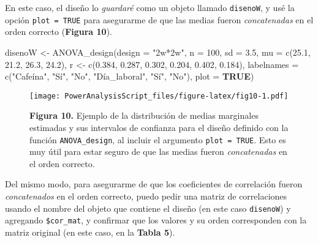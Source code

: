 \documentclass[
]{article}
\newenvironment{Shaded}{\begin{snugshade}}{\end{snugshade}}
\newcommand{\AttributeTok}[1]{\textcolor[rgb]{0.16,0.50,0.73}{#1}}
\newcommand{\ConstantTok}[1]{\textcolor[rgb]{0.15,0.68,0.68}{\textbf{#1}}}
\newcommand{\DecValTok}[1]{\textcolor[rgb]{0.96,0.45,0.00}{#1}}
\newcommand{\FloatTok}[1]{\textcolor[rgb]{0.96,0.45,0.00}{#1}}
\newcommand{\FunctionTok}[1]{\textcolor[rgb]{0.56,0.27,0.68}{#1}}
\newcommand{\NormalTok}[1]{\textcolor[rgb]{0.81,0.81,0.76}{#1}}
\newcommand{\OtherTok}[1]{\textcolor[rgb]{0.15,0.68,0.38}{#1}}
\newcommand{\StringTok}[1]{\textcolor[rgb]{0.96,0.31,0.31}{#1}}
\begin{document}
En este caso, el diseño lo \emph{guardaré} como un objeto llamado
\texttt{disenoW}, y usé la opción \texttt{plot\ =\ TRUE} para asegurarme
de que las medias fueron \emph{concatenadas} en el orden correcto
(\textbf{Figura 10}).

\begin{Shaded}
\begin{Highlighting}[]
\NormalTok{disenoW }\OtherTok{\textless{}{-}} \FunctionTok{ANOVA\_design}\NormalTok{(}\AttributeTok{design =} \StringTok{"2w*2w"}\NormalTok{,}
                        \AttributeTok{n =} \DecValTok{100}\NormalTok{, }\AttributeTok{sd =} \FloatTok{3.5}\NormalTok{, }
                        \AttributeTok{mu =} \FunctionTok{c}\NormalTok{(}\FloatTok{25.1}\NormalTok{, }\FloatTok{21.2}\NormalTok{, }\FloatTok{26.3}\NormalTok{, }\FloatTok{24.2}\NormalTok{), }
\NormalTok{                        r }\OtherTok{\textless{}{-}} \FunctionTok{c}\NormalTok{(}\FloatTok{0.384}\NormalTok{, }\FloatTok{0.287}\NormalTok{, }\FloatTok{0.302}\NormalTok{, }\FloatTok{0.204}\NormalTok{, }\FloatTok{0.402}\NormalTok{, }\FloatTok{0.184}\NormalTok{),}
                        \AttributeTok{labelnames =} \FunctionTok{c}\NormalTok{(}\StringTok{"Cafeína"}\NormalTok{, }\StringTok{"Sí"}\NormalTok{, }\StringTok{"No"}\NormalTok{, }\StringTok{"Día\_laboral"}\NormalTok{, }\StringTok{"Sí"}\NormalTok{, }\StringTok{"No"}\NormalTok{),}
                        \AttributeTok{plot =} \ConstantTok{TRUE}\NormalTok{)}
\end{Highlighting}
\end{Shaded}

\begin{figure}
\centering
\texttt{[image: PowerAnalysisScript\_files/figure-latex/fig10-1.pdf]}
\caption{\textbf{Figura 10.} Ejemplo de la distribución de medias
marginales estimadas y sus intervalos de confianza para el diseño
definido con la función \texttt{ANOVA\_design}, al incluir el argumento
\texttt{plot\ =\ TRUE}. Esto es muy útil para estar seguro de que las
medias fueron \emph{concatenadas} en el orden correcto.}
\end{figure}

Del mismo modo, para asegurarme de que los coeficientes de correlación
fueron \emph{concatenados} en el orden correcto, puedo pedir una matriz
de correlaciones usando el nombre del objeto que contiene el diseño (en
este caso \texttt{disenoW}) y agregando \texttt{\$cor\_mat}, y confirmar
que los valores y su orden corresponden con la matriz original (en este
caso, en la \textbf{Tabla 5}).
\end{document}
